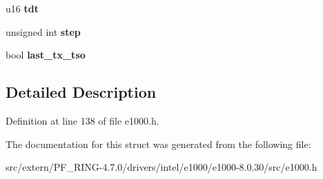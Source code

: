 \begin{DoxyCompactItemize}
\item 
\hypertarget{structe1000__tx__ring_ad59fe4cb8051bcd73c0ae93003e15f4b}{
u16 {\bfseries tdt}}
\label{structe1000__tx__ring_ad59fe4cb8051bcd73c0ae93003e15f4b}

\item 
\hypertarget{structe1000__tx__ring_a50783c68f6bbec5cb5a05df1ada92bcf}{
unsigned int {\bfseries step}}
\label{structe1000__tx__ring_a50783c68f6bbec5cb5a05df1ada92bcf}

\item 
\hypertarget{structe1000__tx__ring_add00e00393ee90bc0ed1ea9beebe56af}{
bool {\bfseries last\_\-tx\_\-tso}}
\label{structe1000__tx__ring_add00e00393ee90bc0ed1ea9beebe56af}

\end{DoxyCompactItemize}


\subsection{Detailed Description}


Definition at line 138 of file e1000.h.



The documentation for this struct was generated from the following file:\begin{DoxyCompactItemize}
\item 
src/extern/PF\_\-RING-\/4.7.0/drivers/intel/e1000/e1000-\/8.0.30/src/e1000.h\end{DoxyCompactItemize}
